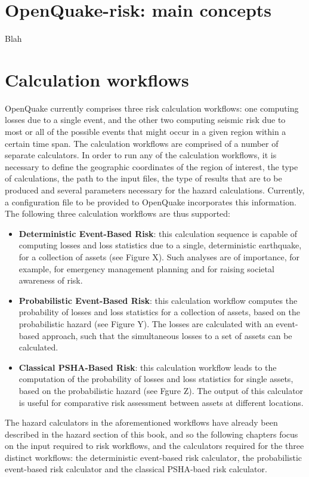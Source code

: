%
\section{OpenQuake-risk: main concepts}
Blah
%
\section{Calculation workflows}
OpenQuake currently comprises three risk calculation workflows: one computing losses due to a single event, and the other two computing seismic risk due to most or all of the possible events that might occur in a given region within a certain time span. The calculation workflows are comprised of a number of separate calculators. In order to run any of the calculation workflows, it is necessary to define the geographic coordinates of the region of interest, the type of calculations, the path to the input files, the type of results that are to be produced and several parameters necessary for the hazard calculations. Currently, a configuration file to be provided to OpenQuake incorporates this information.
The following three calculation workflows are thus supported:
\begin{itemize}
\item \textbf{Deterministic Event-Based Risk}: this calculation sequence is capable of computing losses and loss statistics due to a single,
deterministic earthquake, for a collection of assets (see Figure X). Such analyses are of importance, for example, for emergency management planning and for raising societal awareness of risk. 
\item \textbf{Probabilistic Event-Based Risk}: this calculation workflow computes the probability of losses and loss statistics for a collection of
assets, based on the probabilistic hazard (see Figure Y). The losses are calculated with an event-based approach,
such that the simultaneous losses to a set of assets can be calculated.
\item \textbf{Classical PSHA-Based Risk}: this calculation workflow leads to the computation of the probability of losses and loss statistics for
single assets, based on the probabilistic hazard (see Fgure Z). The output of this calculator is useful for
comparative risk assessment between assets at different locations.
\end{itemize}

The hazard calculators in the aforementioned workflows have already been described in the hazard section of this book, and so the following chapters focus on the input required to risk workflows, and the calculators required for the three distinct workflows: the deterministic event-based risk calculator, the probabilistic event-based risk calculator and the classical PSHA-baed risk calculator.
%
